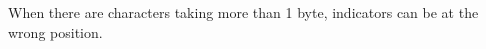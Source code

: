 
\begin{DoxyRefList}
\item[Member \mbox{\hyperlink{class_f_r_d___editor_a8e52d4068a90e2d394a2661a1b8c3cc3}{FRD\+\_\+\+Editor\+::set\+Indicator}} (int start, int length, FRD\+\_\+\+Indicator indicator)]\label{bug__bug000001}%
%
When there are characters taking more than 1 byte, indicators can be at the wrong position. 
\end{DoxyRefList}